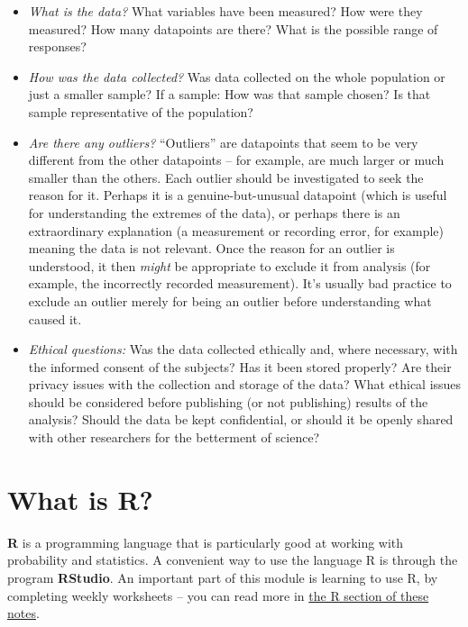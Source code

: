 \documentclass[
  letterpaper,
  DIV=11,
  numbers=noendperiod]{scrreprt}
\providecommand{\tightlist}{%
  \setlength{\itemsep}{0pt}\setlength{\parskip}{0pt}}\usepackage{longtable,booktabs,array}
\theoremstyle{remark}
\begin{document}
\begin{itemize}
\tightlist
\item
  \emph{What is the data?} What variables have been measured? How were
  they measured? How many datapoints are there? What is the possible
  range of responses?
\item
  \emph{How was the data collected?} Was data collected on the whole
  population or just a smaller sample? If a sample: How was that sample
  chosen? Is that sample representative of the population?
\item
  \emph{Are there any outliers?} ``Outliers'' are datapoints that seem
  to be very different from the other datapoints -- for example, are
  much larger or much smaller than the others. Each outlier should be
  investigated to seek the reason for it. Perhaps it is a
  genuine-but-unusual datapoint (which is useful for understanding the
  extremes of the data), or perhaps there is an extraordinary
  explanation (a measurement or recording error, for example) meaning
  the data is not relevant. Once the reason for an outlier is
  understood, it then \emph{might} be appropriate to exclude it from
  analysis (for example, the incorrectly recorded measurement). It's
  usually bad practice to exclude an outlier merely for being an outlier
  before understanding what caused it.
\item
  \emph{Ethical questions:} Was the data collected ethically and, where
  necessary, with the informed consent of the subjects? Has it been
  stored properly? Are their privacy issues with the collection and
  storage of the data? What ethical issues should be considered before
  publishing (or not publishing) results of the analysis? Should the
  data be kept confidential, or should it be openly shared with other
  researchers for the betterment of science?
\end{itemize}

\hypertarget{what-is-R}{%
\section{What is R?}\label{what-is-R}}

\textbf{R} is a programming language that is particularly good at
working with probability and statistics. A convenient way to use the
language R is through the program \textbf{RStudio}. An important part of
this module is learning to use R, by completing weekly worksheets -- you
can read more in \protect\hyperlink{R}{the R section of these notes}.
\end{document}
